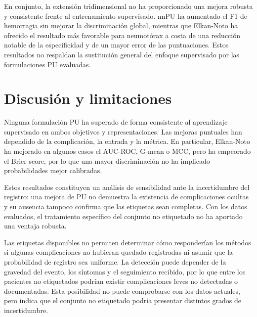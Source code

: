 En conjunto, la extensión tridimensional no ha proporcionado una mejora robusta y consistente frente al entrenamiento supervisado. nnPU ha aumentado el F1 de hemorragia sin mejorar la discriminación global, mientras que Elkan-Noto ha ofrecido el resultado más favorable para neumotórax a costa de una reducción notable de la especificidad y de un mayor error de las puntuaciones. Estos resultados no respaldan la sustitución general del enfoque supervisado por las formulaciones PU evaluadas.

\section{Discusión y limitaciones}

Ninguna formulación PU ha superado de forma consistente al aprendizaje supervisado en ambos objetivos y representaciones. Las mejoras puntuales han dependido de la complicación, la entrada y la métrica. En particular, Elkan-Noto ha mejorado en algunos casos el AUC-ROC, G-mean o MCC, pero ha empeorado el Brier score, por lo que una mayor discriminación no ha implicado probabilidades mejor calibradas.

Estos resultados constituyen un análisis de sensibilidad ante la incertidumbre del registro: una mejora de PU no demuestra la existencia de complicaciones ocultas y su ausencia tampoco confirma que las etiquetas sean completas. Con los datos evaluados, el tratamiento específico del conjunto no etiquetado no ha aportado una ventaja robusta.


Las etiquetas disponibles no permiten determinar cómo responderían los métodos si algunas complicaciones no hubieran quedado registradas ni asumir que la probabilidad de registro sea uniforme. La detección puede depender de la gravedad del evento, los síntomas y el seguimiento recibido, por lo que entre los pacientes no etiquetados podrían existir complicaciones leves no detectadas o documentadas. Esta posibilidad no puede comprobarse con los datos actuales, pero indica que el conjunto no etiquetado podría presentar distintos grados de incertidumbre.

